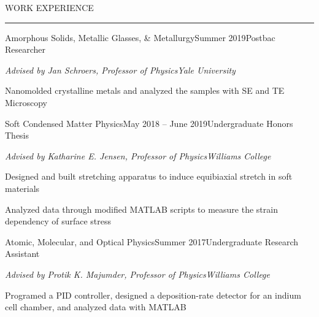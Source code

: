 \documentclass{short_resume} %
\renewenvironment{rSection}[1]{
	\sectionskip
	\textcolor{RoyalPurple}{\MakeUppercase{#1}}
	\sectionlineskip
	\hrule
	\begin{list}{}{
			\setlength{\leftmargin}{1.5em}
		}
		\item[]
	}{
	\end{list}
}
\begin{document}
	\vspace{-1em}
	\begin{rSection}{Work Experience}
		\begin{rSubsection}{Amorphous Solids, Metallic Glasses, \& Metallurgy}{Summer 2019}{Postbac Researcher}{}
			\vspace{-.5em}
			\item[] {\em Advised by Jan Schroers, Professor of Physics}\hfill {\em Yale University}
			\item Nanomolded crystalline metals and analyzed the samples with SE and TE Microscopy
		\end{rSubsection}
		
		
		\begin{rSubsection}{Soft Condensed Matter Physics}{May 2018 -- June 2019}{Undergraduate Honors Thesis}{}
			\vspace{-.5em}
			\item[] {\em Advised by Katharine E. Jensen, Professor of Physics}\hfill {\em Williams College}
			\item Designed and built stretching apparatus to induce equibiaxial stretch in soft materials 
			\item Analyzed data through modified MATLAB scripts to measure the strain dependency of surface stress 
			
		\end{rSubsection}
		
		
		\begin{rSubsection}{Atomic, Molecular, and Optical Physics}{Summer 2017}{Undergraduate Research Assistant}{}
			\vspace{-.5em}
			\item[] {\em Advised by Protik K. Majumder, Professor of Physics}\hfill {\em Williams College}
			\item Programed a PID controller, designed a deposition-rate detector for an indium cell chamber, and analyzed data with MATLAB
		\end{rSubsection}
		
	\end{rSection}
	
	
	
	
	
\end{document}
